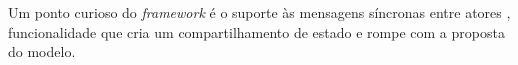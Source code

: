 Um ponto curioso do \textit{framework} é o suporte às mensagens síncronas entre atores \citep{smithAF}, funcionalidade que cria um compartilhamento de estado e rompe com a proposta do modelo.

